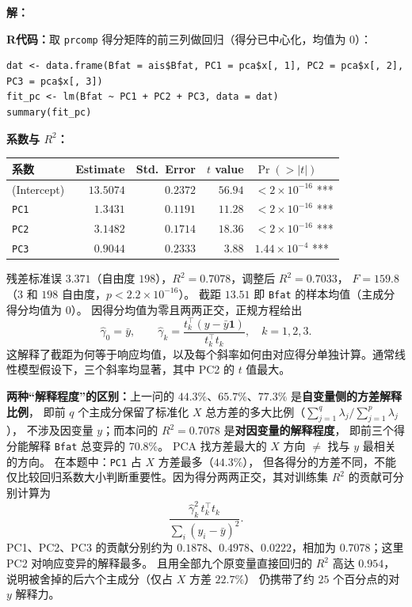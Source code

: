 \documentclass[12pt,a4paper]{article}
\begin{document}
\begin{answerbox}
\textbf{解：}

\textbf{R代码：}取 \texttt{prcomp} 得分矩阵的前三列做回归（得分已中心化，均值为 0）：
\begin{lstlisting}[style=rcode]
dat <- data.frame(Bfat = ais$Bfat, PC1 = pca$x[, 1], PC2 = pca$x[, 2], PC3 = pca$x[, 3])
fit_pc <- lm(Bfat ~ PC1 + PC2 + PC3, data = dat)
summary(fit_pc)
\end{lstlisting}

\textbf{系数与 $R^2$：}
\begin{center}
\small
\begin{tabular}{lrrrl}
\toprule
系数 & Estimate & Std.\ Error & $t$ value & $\Pr(>\lvert t\rvert)$ \\
\midrule
(Intercept) & $13.5074$ & $0.2372$ & $56.94$ & $<2\times 10^{-16}$ *** \\
\texttt{PC1} & $1.3431$ & $0.1191$ & $11.28$ & $<2\times 10^{-16}$ *** \\
\texttt{PC2} & $3.1482$ & $0.1714$ & $18.36$ & $<2\times 10^{-16}$ *** \\
\texttt{PC3} & $0.9044$ & $0.2333$ & $3.88$ & $1.44\times 10^{-4}$ *** \\
\bottomrule
\end{tabular}
\end{center}
残差标准误 $3.371$（自由度 $198$），$R^2=0.7078$，调整后 $R^2=0.7033$，
$F=159.8$（$3$ 和 $198$ 自由度，$p<2.2\times 10^{-16}$）。
截距 $13.51$ 即 \texttt{Bfat} 的样本均值（主成分得分均值为 0）。
因得分均值为零且两两正交，正规方程给出
$$
\hat\gamma_0=\bar y,\qquad
\hat\gamma_k=\frac{t_k^\top(y-\bar y\mathbf1)}{t_k^\top t_k},\quad k=1,2,3.
$$
这解释了截距为何等于响应均值，以及每个斜率如何由对应得分单独计算。通常线性模型假设下，三个斜率均显著，其中 PC2 的 $t$ 值最大。

\textbf{两种``解释程度''的区别：}上一问的 $44.3\%$、$65.7\%$、$77.3\%$ 是\textbf{自变量侧的方差解释比例}，
即前 $q$ 个主成分保留了标准化 $X$ 总方差的多大比例（$\sum_{j=1}^{q}\lambda_j/\sum_{j=1}^{p}\lambda_j$），
不涉及因变量 $y$；而本问的 $R^2=0.7078$ 是\textbf{对因变量的解释程度}，
即前三个得分能解释 \texttt{Bfat} 总变异的 $70.8\%$。
PCA 
找方差最大的 $X$ 方向 $\neq$ 找与 $y$ 最相关的方向。
在本题中：\texttt{PC1} 占 $X$ 方差最多（$44.3\%$），
但各得分的方差不同，不能仅比较回归系数大小判断重要性。因为得分两两正交，其对训练集 $R^2$ 的贡献可分别计算为
$$
\frac{\hat\gamma_k^2\,t_k^\top t_k}{\sum_i(y_i-\bar y)^2}.
$$
PC1、PC2、PC3 的贡献分别约为 $0.1878$、$0.4978$、$0.0222$，相加为 $0.7078$；这里 PC2 对响应变异的解释最多。
且用全部九个原变量直接回归的 $R^2$ 高达 $0.954$，说明被舍掉的后六个主成分（仅占 $X$ 方差 $22.7\%$）
仍携带了约 $25$ 个百分点的对 $y$ 解释力。

\end{answerbox}
\end{document}
